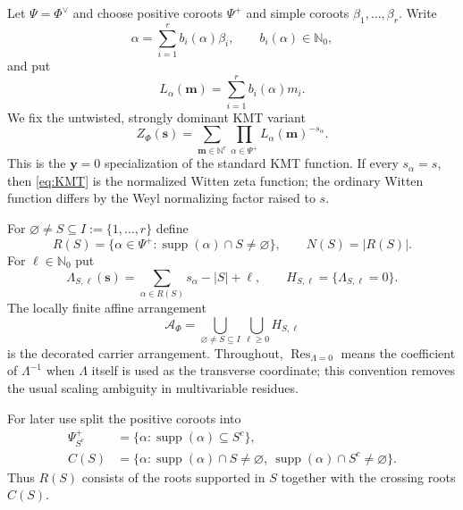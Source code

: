 \documentclass[11pt]{article}
\newcommand{\N}{\mathbb N}
\newcommand{\Nzero}{\mathbb N_0}
\newcommand{\Res}{\operatorname*{Res}}
\newcommand{\supp}{\operatorname{supp}}
\newcommand{\cA}{\mathcal A}
\begin{document}
Let $\Psi=\Phi^\vee$ and choose positive coroots $\Psi^+$ and simple
coroots $\beta_1,\ldots,\beta_r$.  Write
\[
 \alpha=\sum_{i=1}^r b_i(\alpha)\beta_i,
 \qquad b_i(\alpha)\in\Nzero,
\]
and put
\[
 L_\alpha(\mathbf m)=\sum_{i=1}^r b_i(\alpha)m_i.
\]
We fix the untwisted, strongly dominant KMT variant
\begin{equation}\label{eq:KMT}
 Z_\Phi(\mathbf s)
 =\sum_{\mathbf m\in\N^r}
   \prod_{\alpha\in\Psi^+}L_\alpha(\mathbf m)^{-s_\alpha}.
\end{equation}
This is the $\mathbf y=0$ specialization of the standard KMT function.
If every $s_\alpha=s$, then \eqref{eq:KMT} is the normalized Witten
zeta function; the ordinary Witten function differs by the Weyl
normalizing factor raised to $s$.

For $\varnothing\ne S\subseteq I:=\{1,\ldots,r\}$ define
\[
 R(S)=\{\alpha\in\Psi^+:\supp(\alpha)\cap S\ne\varnothing\},
 \qquad N(S)=|R(S)|.
\]
For $\ell\in\Nzero$ put
\begin{equation}\label{eq:Lambda}
 \Lambda_{S,\ell}(\mathbf s)
 =\sum_{\alpha\in R(S)}s_\alpha-|S|+\ell,
 \qquad H_{S,\ell}=\{\Lambda_{S,\ell}=0\}.
\end{equation}
The locally finite affine arrangement
\[
 \cA_\Phi=\bigcup_{\varnothing\ne S\subseteq I}
            \bigcup_{\ell\geq0}H_{S,\ell}
\]
is the decorated carrier arrangement.  Throughout,
\(\Res_{\Lambda=0}\) means the coefficient of \(\Lambda^{-1}\) when
\(\Lambda\) itself is used as the transverse coordinate; this convention
removes the usual scaling ambiguity in multivariable residues.

For later use split the positive coroots into
\begin{align*}
 \Psi^+_{S^c}&=\{\alpha:\supp(\alpha)\subseteq S^c\},\\
 C(S)&=\{\alpha:\supp(\alpha)\cap S\ne\varnothing,
                   \ \supp(\alpha)\cap S^c\ne\varnothing\}.
\end{align*}
Thus $R(S)$ consists of the roots supported in $S$ together with the
crossing roots $C(S)$.
\end{document}
